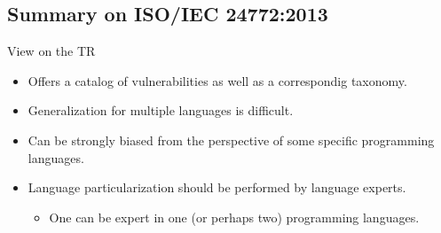 \subsection{Summary on ISO/IEC 24772:2013}

\begin{frame}[t]{View on the TR}
\begin{itemize}

  \item Offers a catalog of vulnerabilities as well as a correspondig
        taxonomy.

  \vfill
  \item Generalization for multiple languages is difficult.

  \vfill
  \item Can be strongly biased from the perspective of some
        specific programming languages.

  \vfill
  \item Language particularization should be performed by language experts.
    \begin{itemize}
      \item One can be expert in one (or perhaps two) programming languages.
    \end{itemize}
\end{itemize}
\end{frame}

